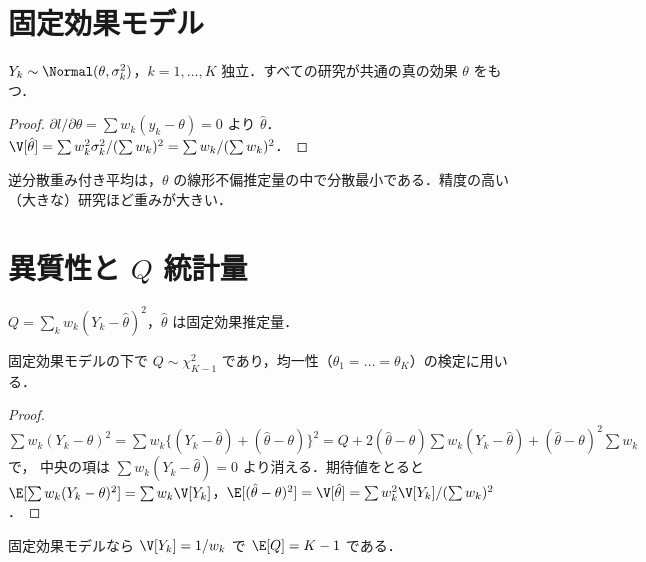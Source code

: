 \section{固定効果モデル}\label{sec:15-fixed}
\Hissu
\begin{teigi}\label{def:15-fe}
$Y_k\sim\Normal(\theta,\sigma_k^2)$，$k=1,\dots,K$ 独立．すべての研究が共通の真の効果 $\theta$ をもつ．
\end{teigi}
\begin{proof}
$\partial l/\partial\theta=\sum w_k(y_k-\theta)=0$ より $\hat\theta$．
$\V[\hat\theta]=\sum w_k^2\sigma_k^2/(\sum w_k)^2=\sum w_k/(\sum w_k)^2$．
\end{proof}
逆分散重み付き平均は，$\theta$ の線形不偏推定量の中で分散最小である．精度の高い（大きな）研究ほど重みが大きい．

\section{異質性と \texorpdfstring{$Q$}{Q} 統計量}\label{sec:15-q}
\Hissu
\begin{teigi}[Cochran の $Q$]\label{def:15-q}
$Q=\sum_kw_k(Y_k-\hat\theta)^2$，$\hat\theta$ は固定効果推定量．
\end{teigi}
固定効果モデルの下で $Q\sim\chi^2_{K-1}$ であり，均一性（$\theta_1=\dots=\theta_K$）の検定に用いる．
\begin{proof}
$\sum w_k(Y_k-\theta)^2=\sum w_k\{(Y_k-\hat\theta)+(\hat\theta-\theta)\}^2=Q+2(\hat\theta-\theta)\sum w_k(Y_k-\hat\theta)+(\hat\theta-\theta)^2\sum w_k$ で，
中央の項は $\sum w_k(Y_k-\hat\theta)=0$ より消える．期待値をとると
$\E[\sum w_k(Y_k-\theta)^2]=\sum w_k\V[Y_k]$，$\E[(\hat\theta-\theta)^2]=\V[\hat\theta]=\sum w_k^2\V[Y_k]/(\sum w_k)^2$．
\end{proof}
固定効果モデルなら $\V[Y_k]=1/w_k$ で $\E[Q]=K-1$ である．


